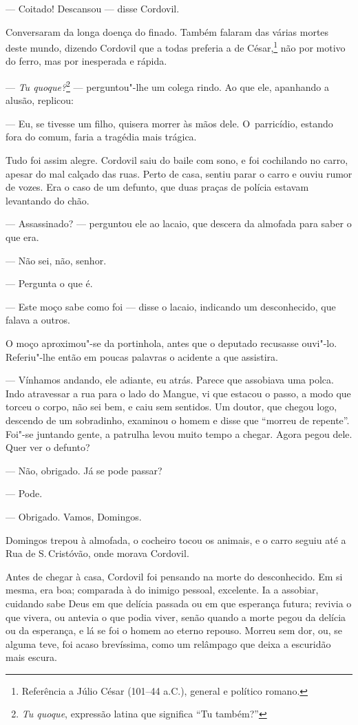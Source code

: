 \begin{linenumbers}
--- Coitado! Descansou --- disse Cordovil.

Conversaram da longa doença do finado. Também falaram das várias mortes
deste mundo, dizendo Cordovil que a todas preferia a de César,\footnote{Referência
  a Júlio César (101--44 a.C.), general e político romano.} não por
motivo do ferro, mas por inesperada e rápida.

--- \emph{Tu quoque?}\footnote{\emph{Tu quoque}, expressão latina que
  significa ``Tu também?''} --- perguntou"-lhe um colega rindo. Ao que
ele, apanhando a alusão, replicou:

--- Eu, se tivesse um filho, quisera morrer às mãos dele. O~parricídio,
estando fora do comum, faria a tragédia mais trágica.

Tudo foi assim alegre. Cordovil saiu do baile com sono, e foi cochilando
no carro, apesar do mal calçado das ruas. Perto de casa, sentiu parar o
carro e ouviu rumor de vozes. Era o caso de um defunto, que duas praças
de polícia estavam levantando do chão.

--- Assassinado? --- perguntou ele ao lacaio, que descera da almofada para
saber o que era.

--- Não sei, não, senhor.

--- Pergunta o que é.

--- Este moço sabe como foi --- disse o lacaio, indicando um desconhecido,
que falava a outros.

O moço aproximou"-se da portinhola, antes que o deputado recusasse
ouvi"-lo. Referiu"-lhe então em poucas palavras o acidente a que
assistira.

--- Vínhamos andando, ele adiante, eu atrás. Parece que assobiava uma
polca. Indo atravessar a rua para o lado do Mangue, vi que estacou o
passo, a modo que torceu o corpo, não sei bem, e caiu sem sentidos. Um
doutor, que chegou logo, descendo de um sobradinho, examinou o homem e
disse que ``morreu de repente''. Foi"-se juntando gente, a patrulha levou
muito tempo a chegar. Agora pegou dele. Quer ver o defunto?

--- Não, obrigado. Já se pode passar?

--- Pode.

--- Obrigado. Vamos, Domingos.

Domingos trepou à almofada, o cocheiro tocou os animais, e o carro
seguiu até a Rua de S.\,Cristóvão, onde morava Cordovil.

Antes de chegar à casa, Cordovil foi pensando na morte do desconhecido.
Em si mesma, era boa; comparada à do inimigo pessoal, excelente. Ia a
assobiar, cuidando sabe Deus em que delícia passada ou em que esperança
futura; revivia o que vivera, ou antevia o que podia viver, senão quando
a morte pegou da delícia ou da esperança, e lá se foi o homem ao eterno
repouso. Morreu sem dor, ou, se alguma teve, foi acaso brevíssima, como
um relâmpago que deixa a escuridão mais escura.


\end{linenumbers}
